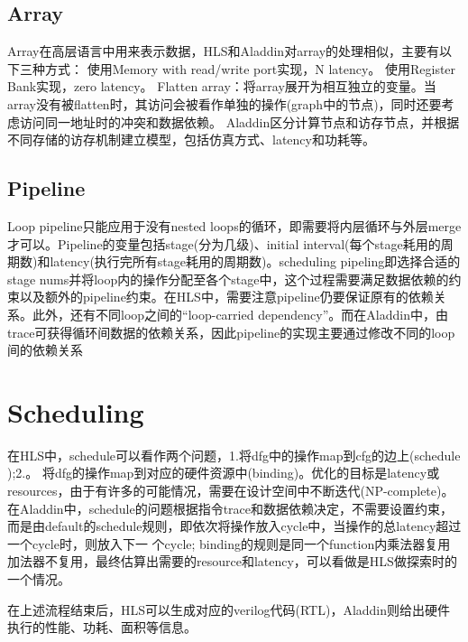\documentclass[UTF8]{scrartcl}
\begin{document}
	\subsection{Array}
		Array在高层语言中用来表示数据，HLS和Aladdin对array的处理相似，主要有以下三种方式：
		使用Memory with read/write port实现，N latency。
		使用Register Bank实现，zero latency。
		Flatten array：将array展开为相互独立的变量。当array没有被flatten时，其访问会被看作单独的操作(graph中的节点)，同时还要考虑访问同一地址时的冲突和数据依赖。
		Aladdin区分计算节点和访存节点，并根据不同存储的访存机制建立模型，包括仿真方式、latency和功耗等。
	\subsection{Pipeline}
		Loop pipeline只能应用于没有nested loops的循环，即需要将内层循环与外层merge才可以。Pipeline的变量包括stage(分为几级)、initial interval(每个stage耗用的周期数)和latency(执行完所有stage耗用的周期数)。scheduling pipeling即选择合适的stage nums并将loop内的操作分配至各个stage中，这个过程需要满足数据依赖的约束以及额外的pipeline约束。在HLS中，需要注意pipeline仍要保证原有的依赖关系。此外，还有不同loop之间的“loop-carried dependency”。而在Aladdin中，由trace可获得循环间数据的依赖关系，因此pipeline的实现主要通过修改不同的loop间的依赖关系
\section{Scheduling}
	在HLS中，schedule可以看作两个问题，1.将dfg中的操作map到cfg的边上(schedule );2.。 将dfg的操作map到对应的硬件资源中(binding)。优化的目标是latency或resources，由于有许多的可能情况，需要在设计空间中不断迭代(NP-complete)。 
	在Aladdin中，schedule的问题根据指令trace和数据依赖决定，不需要设置约束，而是由default的schedule规则，即依次将操作放入cycle中，当操作的总latency超过一个cycle时，则放入下一 个cycle; binding的规则是同一个function内乘法器复用加法器不复用，最终估算出需要的resource和latency，可以看做是HLS做探索时的一个情况。 
	
	在上述流程结束后，HLS可以生成对应的verilog代码(RTL)，Aladdin则给出硬件执行的性能、功耗、面积等信息。

%

%
\end{document}
